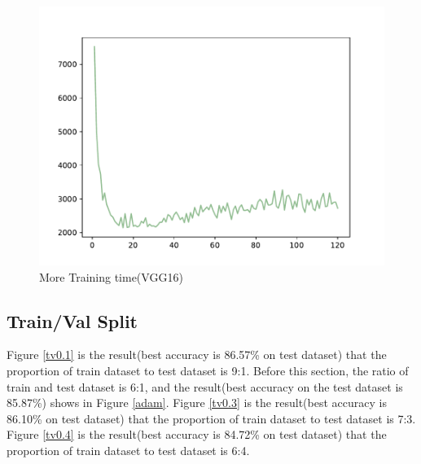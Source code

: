 \documentclass{article}
\begin{document}
\begin{figure}[!h]
{\begin{minipage}{0.21\linewidth}
  \includegraphics[scale=0.23]{imgs/test_loss_vgg.pdf}
  \end{minipage}
}
\quad
{}
\caption{More Training time(VGG16)}
\label{vgg16}
\end{figure}

\subsection{Train/Val Split}
Figure \ref{tv0.1} is the result(best accuracy is 86.57\% on test dataset) that the proportion of train dataset to test dataset is 9:1. Before this section, the ratio of train and test dataset is 6:1, and the result(best accuracy on the test dataset is 85.87\%) shows in Figure \ref{adam}. Figure \ref{tv0.3} is the result(best accuracy is 86.10\% on test dataset) that the proportion of train dataset to test dataset is 7:3.   Figure \ref{tv0.4} is the result(best accuracy is 84.72\% on test dataset) that the proportion of train dataset to test dataset is 6:4. 
\end{document}
